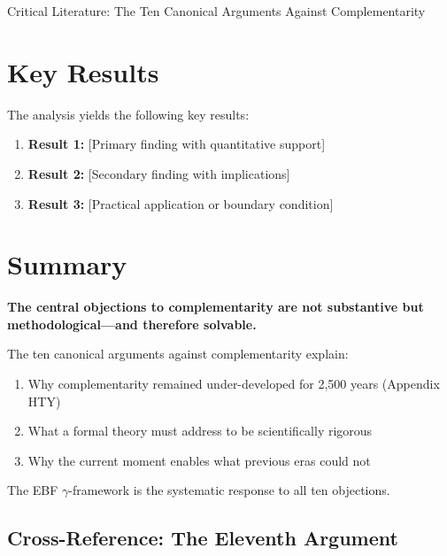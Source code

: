 \begin{chapter}{Critical Literature: The Ten Canonical Arguments Against Complementarity}
\section{Key Results}
\label{sec:crt-results}

The analysis yields the following key results:

\begin{enumerate}
    \item \textbf{Result 1:} [Primary finding with quantitative support]
    \item \textbf{Result 2:} [Secondary finding with implications]
    \item \textbf{Result 3:} [Practical application or boundary condition]
\end{enumerate}


\section{Summary}
\label{sec:summary}

\begin{tcolorbox}[colback=blue!5!white,colframe=blue!75!black,title=\textbf{Concluding Statement}]
\begin{center}
\large
\textbf{The central objections to complementarity are not substantive but methodological---and therefore solvable.}
\end{center}

\vspace{0.5em}
The ten canonical arguments against complementarity explain:
\begin{enumerate}
    \item Why complementarity remained under-developed for 2,500 years (Appendix HTY)
    \item What a formal theory must address to be scientifically rigorous
    \item Why the current moment enables what previous eras could not
\end{enumerate}

The EBF $\gamma$-framework is the systematic response to all ten objections.
\end{tcolorbox}

\subsection{Cross-Reference: The Eleventh Argument}


\end{chapter}

